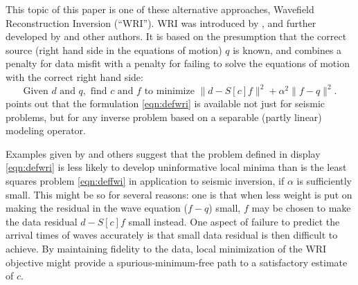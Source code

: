 This topic of this paper is one of these alternative approaches,
Wavefield Reconstruction Inversion (``WRI''). WRI was introduced by \cite{LeeuwenHerrmannWRI:13}, and further
developed by \cite{LeeuwenHerrmann:16,WangYingst:SEG16} and other
authors. It is based on the presumption that the correct source (right
hand side in the equations of motion) $q$ is
known, and combines a penalty for data misfit with a penalty for
failing to solve the equations of motion with the correct right hand side:
\begin{equation}
  \label{eqn:defwri}
  \mbox{Given } d \mbox{ and }q, \mbox{ find }c \mbox{ and }f \mbox{ to
    minimize }
  \|d -  S[c]f\|^2+\alpha^2\|f-q\|^2.
\end{equation}
\cite{Leeuwen2019note} points out that the formulation
\ref{eqn:defwri} is available not just for seismic problems, but for
any inverse problem based on a separable (partly linear) modeling
operator.

Examples given by \cite{LeeuwenHerrmannWRI:13} and others suggest that
the problem defined in display \ref{eqn:defwri} is less likely to
develop uninformative local minima than is the least squares problem
\ref{eqn:deffwi} in application to seismic inversion, if $\alpha$ is
sufficiently small. This might be so for several reasons: one is that
when less weight is put on making the residual in the wave equation
($f-q$) small, $f$ may be chosen to make the data residual $d-S[c]f$
small instead. One aspect of failure to predict the arrival times of
waves accurately is that small data residual is then difficult to
achieve. By maintaining fidelity to the data, local minimization of
the WRI objective might provide a spurious-minimum-free path to a
satisfactory estimate of $c$.

